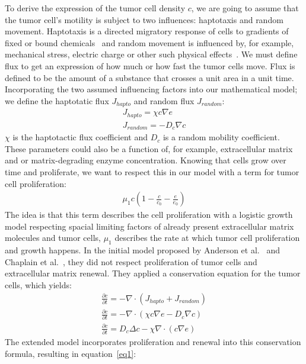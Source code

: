 To derive the expression of the tumor cell density $c$, we are going to assume that the tumor cell's motility is subject to two influences: haptotaxis and random movement. Haptotaxis is a directed migratory response of cells to gradients of fixed or bound chemicals~\cite{anderson_continuous_1998} and random movement is influenced by, for example, mechanical stress, electric charge or other such physical effects~\cite{Merino-Casallo2022-di}. We must define flux to get an expression of how much or how fast the tumor cells move. Flux is defined to be the amount of a substance that crosses a unit area in a unit time. Incorporating the two assumed influencing factors into our mathematical model; we define the haptotatic flux $J_{hapto}$ and random flux $J_{random}$:
\begin{align*}
    J_{hapto} = \chi c \nabla e \\
    J_{random} = -D_c \nabla c
\end{align*}
$\chi$ is the haptotactic flux coefficient and $D_c$ is a random mobility coefficient. These parameters could also be a function of, for example, extracellular matrix and or matrix-degrading enzyme concentration. Knowing that cells grow over time and proliferate, we want to respect this in our model with a term for tumor cell 
proliferation: 
\begin{align*}
    \mu_1 c (1-\frac{c}{c_0} - \frac{e}{e_0})
\end{align*}
The idea is that this term describes the cell proliferation with a logistic growth model respecting spacial limiting factors of already present extracellular matrix molecules and tumor cells, $\mu_1$ describes the rate at which tumor cell proliferation and growth happens. In the initial model proposed by Anderson et al.~\cite{anderson_continuous_1998, anderson_mathematical_2000} and Chaplain et al.~\cite{anderson_continuous_1998,chaplain_mathematical_2006-1,franssen_mathematical_2019}, they did not respect proliferation of tumor cells and extracellular matrix renewal. They applied a conservation equation for the tumor cells, which yields:
\begin{align*}
    \frac{\partial c}{\partial t} = -\nabla \cdot (J_{hapto} + J_{random}) \\
    \frac{\partial c}{\partial t} = -\nabla \cdot (\chi c \nabla e -D_c \nabla c ) \\
    \frac{\partial c}{\partial t} = D_c \Delta c - \chi \nabla \cdot (c\nabla e)
\end{align*}
The extended model incorporates proliferation and renewal into this conservation formula, resulting in equation~\ref{eq1}:
